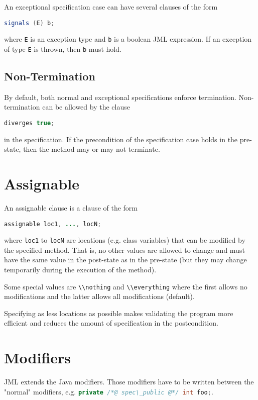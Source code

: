 \documentclass[a4paper, 11pt, accentcolor = tud3b]{tudreport}
\newcommand{\inlineJava}[1]{\lstinline[language = Java]|#1|}
\begin{document}
					An exceptional specification case can have several clauses of the form
					\begin{center}
						\inlineJava{signals (E) b;}
					\end{center}
					where \texttt{E} is an exception type and \texttt{b} is a boolean JML expression. If an exception of type \texttt{E} is thrown, then \texttt{b} must hold.

			\subsection{Non-Termination}
				By default, both normal and exceptional specifications enforce termination. Non-termination can be allowed by the clause
				\begin{center}
					\inlineJava{diverges true;}
				\end{center}
				in the specification. If the precondition of the specification case holds in the pre-state, then the method may or may not terminate.

		\section{Assignable}
			An assignable clause is a clause of the form
			\begin{center}
				\inlineJava{assignable loc1, ..., locN;}
			\end{center}
			where \texttt{loc1} to \texttt{locN} are locations (e.g. class variables) that can be modified by the specified method. That is, no other values are allowed to change and must have the same value in the post-state as in the pre-state (but they may change temporarily during the execution of the method).
			
			Some special values are \inlineJava{\\nothing} and \inlineJava{\\everything} where the first allows no modifications and the latter allows all modifications (default).
			
			Specifying as less locations as possible makes validating the program more efficient and reduces the amount of specification in the postcondition.

		\section{Modifiers}
			\label{sec:additionalmod}
		
			JML extends the Java modifiers. Those modifiers have to be written between the "normal" modifiers, e.g. \inlineJava{private /*@ spec\_public @*/ int foo;}.
		
\end{document}
